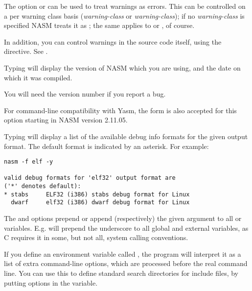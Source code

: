 The option  or  can be used to treat warnings
as errors. This can be controlled on a per warning class basis
(\emph{warning-class} or \emph{warning-class});
if no \emph{warning-class} is specified NASM treats it as
; the same applies to  or
, of course.

In addition, you can control warnings in the source code itself, using
the \codeindex{[WARNING]} directive. See .


Typing  will display the version of NASM which you are using,
and the date on which it was compiled.

You will need the version number if you report a bug.

For command-line compatibility with Yasm, the form  is also
accepted for this option starting in NASM version 2.11.05.


Typing  will display a list of the available
debug info formats for the given output format. The default format
is indicated by an asterisk. For example:

\begin{lstlisting}
nasm -f elf -y

valid debug formats for 'elf32' output format are
('*' denotes default):
* stabs     ELF32 (i386) stabs debug format for Linux
  dwarf     elf32 (i386) dwarf debug format for Linux
\end{lstlisting}


The  and  options prepend or append
(respectively) the given argument to all  or
 variables. E.g.  will prepend the
underscore to all global and external variables, as C requires it in
some, but not all, system calling conventions.


If you define an environment variable called , the program
will interpret it as a list of extra command-line options, which are
processed before the real command line. You can use this to define
standard search directories for include files, by putting 
options in the  variable.

